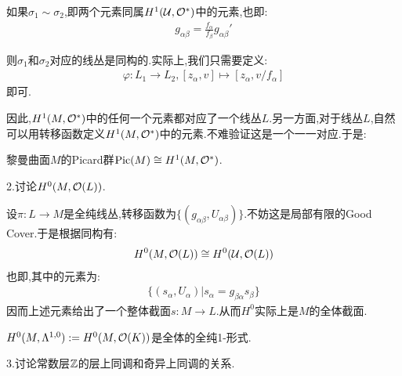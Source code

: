 如果$\sigma_1 \sim \sigma_2$,即两个元素同属$H^1(\mathcal{U},\mathcal{O}^*)$中的元素,也即:
\begin{align*}
	g_{\alpha\beta}=\frac{f_\alpha}{f_\beta}g_{\alpha\beta}'
\end{align*}

则$\sigma_1$和$\sigma_2$对应的线丛是同构的.实际上,我们只需要定义:
\begin{align*}
	\varphi: L_1 \to L_2, [z_\alpha,v]\mapsto [z_\alpha,v/f_\alpha]
\end{align*}
即可.

因此,$H^1(M,\mathcal{O}^*)$中的任何一个元素都对应了一个线丛$L$.另一方面,对于线丛$L$,自然可以用转移函数定义$H^1(M,\mathcal{O}^*)$中的元素.不难验证这是一个一一对应.于是:
\begin{proposition}
	黎曼曲面$M$的Picard群$\mathrm{Pic}(M)\cong H^1(M,\mathcal{O}^*)$.
\end{proposition}

2.讨论$H^0(M,\mathcal{O}(L))$.

设$\pi:L \to M$是全纯线丛,转移函数为$\{(g_{\alpha\beta},U_{\alpha\beta})\}$.不妨这是局部有限的Good Cover.于是根据同构有:
\begin{align*}
	H^0(M,\mathcal{O}(L))\cong H^0(\mathcal{U},\mathcal{O}(L))
\end{align*}
也即,其中的元素为:
\begin{align*}
	\{(s_\alpha,U_\alpha)|s_\alpha=g_{\beta\alpha}s_\beta\}
\end{align*}
因而上述元素给出了一个整体截面$s:M \to L$.从而$H^0$实际上是$M$的全体截面.

\begin{corollary}
	$H^0(M,\Lambda^{1,0}):=H^0(M,\mathcal{O}(K))$是全体的全纯1-形式.
\end{corollary}

3.讨论常数层$\mathbb{Z}$的层上同调和奇异上同调的关系.

